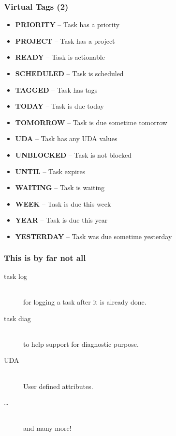 \documentclass[t,handout]{beamer}
\begin{document}
\begin{frame}[fragile]\frametitle{Virtual Tags (2)}
    \vfill
    \begin{itemize}
        \item \textbf{PRIORITY}     -- Task has a priority
        \item \textbf{PROJECT}      -- Task has a project
        \item \textbf{READY}        -- Task is actionable
        \item \textbf{SCHEDULED}    -- Task is scheduled
        \item \textbf{TAGGED}       -- Task has tags
        \item \textbf{TODAY}        -- Task is due today
        \item \textbf{TOMORROW}     -- Task is due sometime tomorrow
        \item \textbf{UDA}          -- Task has any UDA values
        \item \textbf{UNBLOCKED}    -- Task is not blocked
        \item \textbf{UNTIL}        -- Task expires
        \item \textbf{WAITING}      -- Task is waiting
        \item \textbf{WEEK}         -- Task is due this week
        \item \textbf{YEAR}         -- Task is due this year
        \item \textbf{YESTERDAY}    -- Task was due sometime yesterday
    \end{itemize}
\end{frame}

\begin{frame}[fragile]\frametitle{This is by far not all}
    \vfill
    \begin{description}
        \item[task log] \hfill \\
            for logging a task after it is already done.
        \item[task diag] \hfill \\
            to help support for diagnostic purpose.
        \item[UDA] \hfill \\
            User defined attributes.
        \item[\ldots] \hfill \\
            and many more!
    \end{description}
\end{frame}
\end{document}
